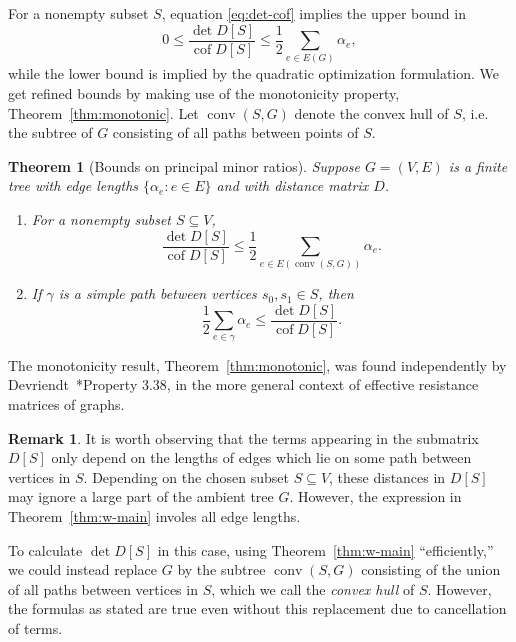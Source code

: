 \documentclass[12pt]{amsart}
\newtheorem{thm}{Theorem}[section]
\theoremstyle{definition}
\newtheorem*{rmk*}{Remark}
\newcommand{\Da}{{D}}
\DeclareMathOperator{\cof}{cof}
\DeclareMathOperator{\conv}{conv}
\newcommand\farbod[1]{\footnote{[\textcolor{orange}{(Farbod)} \textcolor{blue}{#1}]}}
\begin{document}
For a nonempty subset $S$, equation \eqref{eq:det-cof} implies the upper bound in
\begin{equation}
	0 \leq \frac{\det D[S]}{\cof D[S]} \leq \frac12 \sum_{e \in E(G)} \alpha_e ,
\end{equation}
while the lower bound is implied by the quadratic optimization formulation.
We get refined bounds by making use of the monotonicity property, Theorem~\ref{thm:monotonic}. Let $\conv(S,G)$ denote the convex hull of $S$, i.e. the subtree of $G$ consisting of all paths between points of $S$.
 
\begin{thm}[Bounds on principal minor ratios]
\label{thm:det-cof-bounds}
Suppose $G = (V,E)$ is a finite tree with edge lengths $\{\alpha_e \colon e \in E\}$ and with distance matrix $\Da$.
\begin{enumerate}[label=(\alph*)]
\item
For a nonempty subset $S \subseteq V$,
\begin{equation*}
	\frac{\det \Da[S]}{\cof \Da[S]} \leq \frac12 \sum_{e \in E(\conv(S, G))} \alpha_e .
\end{equation*}
\item 
If $\gamma$ is a simple path between vertices $s_0, s_1 \in S$, then
\begin{equation*}
	\frac12 \sum_{e \in \gamma} \alpha_e \leq \frac{\det \Da[S]}{\cof \Da[S]}.
\end{equation*}
\end{enumerate}
\end{thm}

The monotonicity result, Theorem~\ref{thm:monotonic}, was found independently by
Devriendt~\cite{devriendt-thesis}*{Property 3.38},
in the more general context of effective resistance matrices of graphs.


\begin{rmk*}
	It is worth observing that the terms appearing in the submatrix $D[S]$ only depend on the lengths of edges which lie on some path between vertices in $S$.
	Depending on the chosen subset $S \subseteq V$, these distances in $D[S]$ may ignore a large part of the ambient tree $G$.
	However, the expression in Theorem~\ref{thm:w-main} involes all edge lengths.

	To calculate $\det D[S]$ in this case, using Theorem~\ref{thm:w-main} ``efficiently,'' we could instead replace $G$ by the subtree  $\conv(S,G)$ consisting of the union of all paths between vertices in $S$,
	which we call the {\em convex hull} of $S$.
	However, the formulas as stated are true even without this replacement due to cancellation of terms.
\end{rmk*}
	
\end{document}
